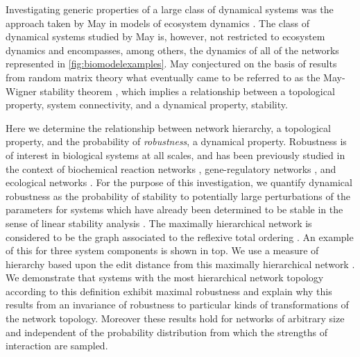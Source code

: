 Investigating generic properties of a large class of dynamical systems was the approach taken by May in models of ecosystem dynamics \cite{Gardner1970,May1972}. The class of dynamical systems studied by May is, however, not restricted to ecosystem dynamics and encompasses, among others, the dynamics of all of the networks represented in \ref{fig:biomodelexamples}. May conjectured on the basis of results from random matrix theory what eventually came to be referred to as the May-Wigner stability theorem \cite{Cohen1984,May1972a,Radius2014,Majumdar2014}, which implies a relationship between a topological property, system connectivity, and a dynamical property, stability.


Here we determine the relationship between network hierarchy, a topological property, and the probability of \emph{robustness}, a dynamical property. Robustness is of interest in biological systems at all scales, and has been previously studied in the context of biochemical reaction networks \cite{Shinar2010}, gene-regulatory networks \cite{VanNimwegen1999,Siegal2002,Draghi2010,Wagner2013}, and ecological networks \cite{Rohr2014}. For the purpose of this investigation, we quantify dynamical robustness as the probability of stability to potentially large perturbations of the parameters for systems which have already been determined to be stable in the sense of linear stability analysis \cite{Davis1962}. The maximally hierarchical network is considered to be the graph associated to the reflexive total ordering \cite{Cormen2009}. An example of this for three system components is shown in  top. We use a measure of hierarchy based upon the edit distance from this maximally hierarchical network \cite{Axenovich2011}. We demonstrate that systems with the most hierarchical network topology according to this definition exhibit maximal robustness and explain why this results from an invariance of robustness to particular kinds of transformations of the network topology. Moreover these results hold for networks of arbitrary size and independent of the probability distribution from which the strengths of interaction are sampled.

